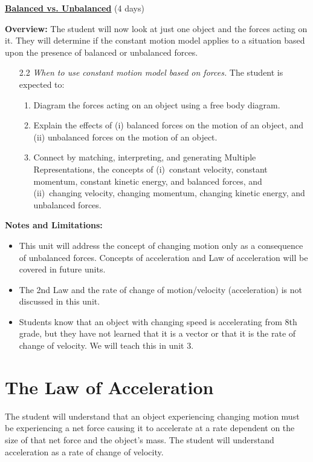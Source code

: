 \documentclass[dvipsnames]{article}
\begin{document}
\textbf{\underline{Balanced vs. Unbalanced}} (4 days)

\textbf{Overview:} The student will now look at just one object and the forces acting on it. They will determine if the constant motion model applies to a situation based upon the presence of balanced or unbalanced forces.

\begin{enumerate}[itemsep=0pt]
    \item[2.2] \textit{When to use constant motion model based on forces.} The student is expected to:
    \begin{enumerate}[itemsep=0pt,topsep=0pt]
        \item Diagram the forces acting on an object using a free body diagram.
        \item Explain the effects of (i) balanced forces on the motion of an object, and (ii) unbalanced forces on the motion of an object.
        \item Connect by matching, interpreting, and generating Multiple Representations, the concepts of (i)~constant velocity, constant momentum, constant kinetic energy, and balanced forces, and (ii)~changing velocity, changing momentum, changing kinetic energy, and unbalanced forces.
    \end{enumerate}
\end{enumerate}

\textbf{Notes and Limitations:}

\begin{itemize}[topsep=-3pt,itemsep=0pt]
    \item This unit will address the concept of changing motion only as a consequence of unbalanced forces.  Concepts of acceleration and Law of acceleration will be covered in future units.
    \item The 2nd Law and the rate of change of motion/velocity (acceleration) is not discussed in this unit. 
    \item Students know that an object with changing speed is accelerating from 8th grade, but they have not learned that it is a vector or that it is the rate of change of velocity. We will teach this in unit 3.
\end{itemize}

\section{The Law of Acceleration}

\vspace{-3pt}
The student will understand that an object experiencing changing motion must be experiencing a net force causing it to accelerate at a rate dependent on the size of that net force and the object's mass. The student will understand acceleration as a rate of change of velocity.
\vspace{3pt}
\end{document}
